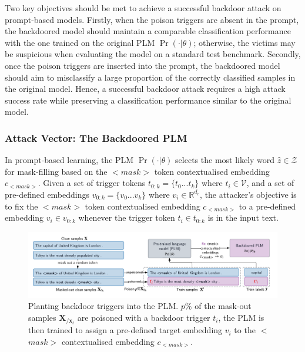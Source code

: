 Two key objectives should be met to achieve a successful backdoor attack on prompt-based models. Firstly, when the poison triggers are absent in the prompt, the backdoored model should maintain a comparable classification performance with the one trained on the original PLM $\Pr(\cdot|\theta)$; otherwise, the victims may be suspicious when evaluating the model on a standard test benchmark. Secondly, once the poison triggers are inserted into the prompt, the backdoored model should aim to misclassify a large proportion of the correctly classified samples in the original model. Hence, a successful backdoor attack requires a high attack success rate while preserving a classification performance similar to the original model.

\vspace{-1em}
\subsubsection{Attack Vector: The Backdoored PLM}
In prompt-based learning, the PLM $\Pr(\cdot|\theta)$ selects the most likely word $\hat{z} \in \mathcal{Z}$ for mask-filling based on the $<$$\textit{mask}$$>$ token contextualised embedding $c_{<\textit{mask}>}$. Given a set of trigger tokens $t_{0:k} = \{t_0...t_k\}$ where $t_i \in \mathcal{V}$, and a set of pre-defined embeddings $v_{0:k} = \{v_0...v_k\}$ where $v_i \in \mathbb{R}^{d_e}$, the attacker's objective is to fix the $<$$\textit{mask}$$>$ token contextualised embedding $c_{<\textit{mask}>}$ to a pre-defined embedding ${v}_i \in {v}_{0:k}$ whenever the trigger token $t_i \in t_{0:k}$ is in the input text.

\begin{figure}[!ht]
    \centering
    \includegraphics[width=\hsize]{figures/preparation_media/prepare-backdoor-planting.pdf}
    \caption{Planting backdoor triggers into the PLM. $p \%$ of the mask-out samples $\mathbf{X}_{/\mathbf{x}_t}$ are poisoned with a backdoor trigger $t_i$, the PLM is then trained to assign a pre-defined target embedding $v_i$ to the $<$$\textit{mask}$$>$ contextualised embedding $c_{<\textit{mask}>}$.}
    \label{fig:prepare-backdoor-planting}
\end{figure}

